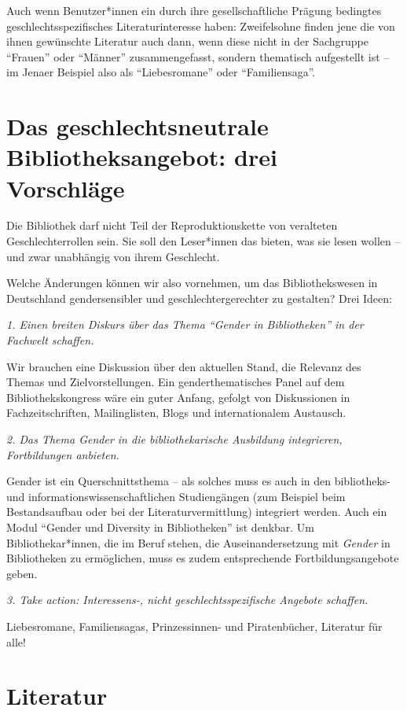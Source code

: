 \documentclass[a4paper,
fontsize=11pt,
oneside,
numbers=noperiodatend,
parskip=half-,
bibliography=totoc,
final
]{scrartcl}
\begin{document}
Auch wenn Benutzer*innen ein durch ihre gesellschaftliche Prägung
bedingtes geschlechtsspezifisches Literaturinteresse haben: Zweifelsohne
finden jene die von ihnen gewünschte Literatur auch dann, wenn diese
nicht in der Sachgruppe \enquote{Frauen} oder \enquote{Männer}
zusammengefasst, sondern thematisch aufgestellt ist -- im Jenaer
Beispiel also als \enquote{Liebesromane} oder \enquote{Familiensaga}.

\section*{Das geschlechtsneutrale Bibliotheksangebot: drei
Vorschläge}\label{das-geschlechtsneutrale-bibliotheksangebot-drei-vorschluxe4ge}

Die Bibliothek darf nicht Teil der Reproduktionskette von veralteten
Geschlechterrollen sein. Sie soll den Leser*innen das bieten, was sie
lesen wollen -- und zwar unabhängig von ihrem Geschlecht.

Welche Änderungen können wir also vornehmen, um das Bibliothekswesen in
Deutschland gendersensibler und geschlechtergerechter zu gestalten? Drei
Ideen:

\emph{1. Einen breiten Diskurs über das Thema \enquote{Gender in
Bibliotheken} in der Fachwelt schaffen.}

Wir brauchen eine Diskussion über den aktuellen Stand, die Relevanz des
Themas und Zielvorstellungen. Ein genderthematisches Panel auf dem
Bibliothekskongress wäre ein guter Anfang, gefolgt von Diskussionen in
Fachzeitschriften, Mailinglisten, Blogs und internationalem Austausch.

\emph{2. Das Thema Gender in die bibliothekarische Ausbildung
integrieren, Fortbildungen anbieten.}

Gender ist ein Querschnittsthema -- als solches muss es auch in den
bibliotheks- und informationswissenschaftlichen Studiengängen (zum
Beispiel beim Bestandsaufbau oder bei der Literaturvermittlung)
integriert werden. Auch ein Modul \enquote{Gender und Diversity in
Bibliotheken} ist denkbar. Um Bibliothekar*innen, die im Beruf stehen,
die Auseinandersetzung mit \emph{Gender} in Bibliotheken zu ermöglichen,
muss es zudem entsprechende Fortbildungsangebote geben.

\emph{3. Take action: Interessens-, nicht geschlechtsspezifische
Angebote schaffen.}

Liebesromane, Familiensagas, Prinzessinnen- und Piratenbücher, Literatur
für alle!

\section*{Literatur}\label{literatur}
\end{document}
